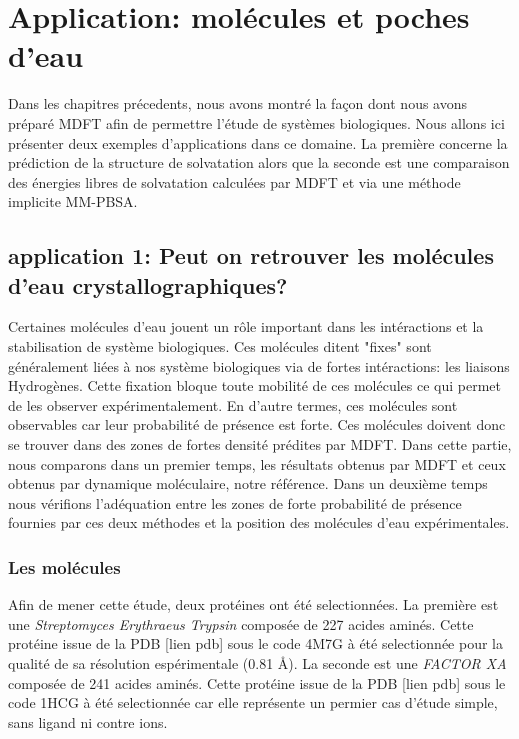 \chapter{Application: molécules et poches d'eau}


Dans les chapitres précedents, nous avons montré la façon dont nous avons préparé MDFT afin de permettre l'étude de systèmes biologiques. Nous allons ici présenter deux exemples d'applications dans ce domaine. La première concerne la prédiction de la structure de solvatation alors que la seconde est une comparaison des énergies libres de solvatation calculées par MDFT et via une méthode implicite MM-PBSA.


\section{application 1: Peut on retrouver les molécules d'eau crystallographiques?}
Certaines molécules d'eau jouent un rôle important dans les intéractions et la stabilisation de système biologiques. Ces molécules ditent "fixes" sont généralement liées à nos système biologiques via de fortes intéractions: les liaisons Hydrogènes. Cette fixation bloque toute mobilité de ces molécules ce qui permet de les observer expérimentalement. En d'autre termes, ces molécules sont observables car leur probabilité de présence est forte. Ces molécules doivent donc se trouver dans des zones de fortes densité prédites par MDFT.
Dans cette partie, nous comparons dans un premier temps, les résultats obtenus par MDFT et ceux obtenus par dynamique moléculaire, notre référence. Dans un deuxième temps nous vérifions l'adéquation entre les zones de forte probabilité de présence fournies par ces deux méthodes et la position des molécules d'eau expérimentales.




\subsection{Les molécules}
Afin de mener cette étude, deux protéines ont été selectionnées. La première est une \textit{Streptomyces Erythraeus Trypsin} composée de 227 acides aminés. Cette protéine issue de la PDB [lien pdb] sous le code 4M7G à été selectionnée pour la qualité de sa résolution espérimentale (0.81 \AA).
La seconde est une \textit{FACTOR XA} composée de 241 acides aminés. Cette protéine issue de la PDB [lien pdb] sous le code 1HCG à été selectionnée car elle représente un permier cas d'étude simple, sans ligand ni contre ions.

